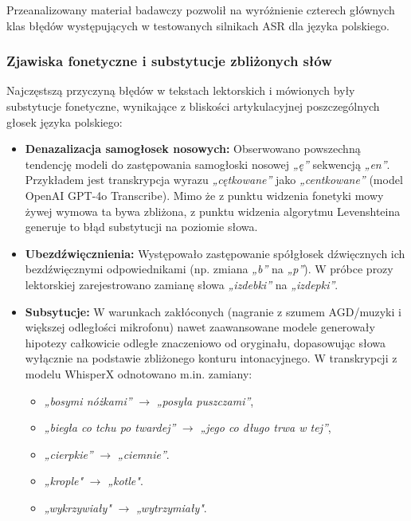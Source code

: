Przeanalizowany materiał badawczy pozwolił na wyróżnienie czterech głównych klas błędów występujących w testowanych silnikach ASR dla języka polskiego.

\subsubsection{Zjawiska fonetyczne i substytucje zbliżonych słów}
\label{subsubsec:phonetic_errors}

Najczęstszą przyczyną błędów w tekstach lektorskich i mówionych były substytucje fonetyczne, wynikające z bliskości artykulacyjnej poszczególnych głosek języka polskiego:

\begin{itemize}
    \item \textbf{Denazalizacja samogłosek nosowych:} Obserwowano powszechną tendencję modeli do zastępowania samogłoski nosowej \textit{„ę”} sekwencją \textit{„en”}. Przykładem jest transkrypcja wyrazu \textit{„cętkowane”} jako \textit{„centkowane”} (model OpenAI GPT-4o Transcribe). Mimo że z punktu widzenia fonetyki mowy żywej wymowa ta bywa zbliżona, z punktu widzenia algorytmu Levenshteina generuje to błąd substytucji na poziomie słowa.
    \item \textbf{Ubezdźwięcznienia:} Występowało zastępowanie spółgłosek dźwięcznych ich bezdźwięcznymi odpowiednikami (np. zmiana \textit{„b”} na \textit{„p”}). W próbce prozy lektorskiej zarejestrowano zamianę słowa \textit{„izdebki”} na \textit{„izdepki”}.
    \item \textbf{Subsytucje:} W warunkach zakłóconych (nagranie z szumem AGD/muzyki i większej odległości mikrofonu) nawet zaawansowane modele generowały hipotezy całkowicie odległe znaczeniowo od oryginału, dopasowując słowa wyłącznie na podstawie zbliżonego konturu intonacyjnego. W transkrypcji z modelu WhisperX odnotowano m.in. zamiany:
    \begin{itemize}
        \item \textit{„bosymi nóżkami”} $\rightarrow$ \textit{„posyła puszczami”},
        \item \textit{„biegła co tchu po twardej”} $\rightarrow$ \textit{„jego co długo trwa w tej”},
        \item \textit{„cierpkie”} $\rightarrow$ \textit{„ciemnie”}.
        \item \textit{„krople"} $\rightarrow$ \textit{„kotle"}.
        \item \textit{„wykrzywiały"} $\rightarrow$ \textit{„wytrzymiały"}.
    \end{itemize}
\end{itemize}

